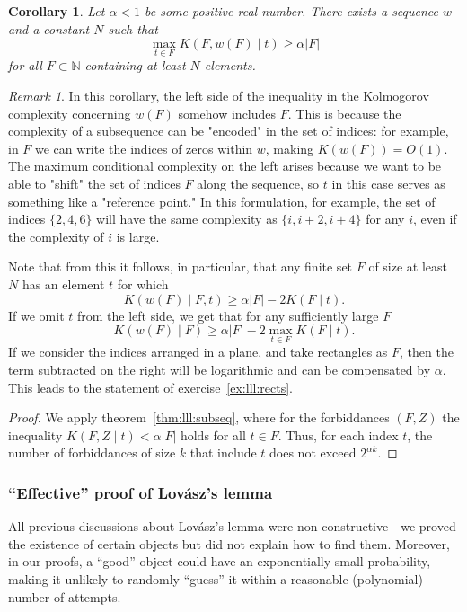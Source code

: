 \documentclass[12pt,sans]{article}
\theoremstyle{definition}
\theoremstyle{plain}
\newtheorem{corollary}{Corollary}[section]
\theoremstyle{remark}
\newtheorem{remark}{Remark}[section]
\begin{document}
\begin{corollary}
    Let $\alpha < 1$ be some positive real number.
    There exists a sequence $w$ and a constant $N$ such that
    \[
    \max_{t\in F} K(F,w(F) \mid t) \ge \alpha |F|
    \]
    for all $F\subset\mathbb{N}$ containing at least $N$ elements.
\end{corollary}

\begin{remark}
    In this corollary, the left side of the inequality in the Kolmogorov complexity concerning $w(F)$
    somehow includes $F$. This is because the complexity of a subsequence
    can be "encoded" in the set of indices: for example, in $F$ we can write
    the indices of zeros within $w$, making $K(w(F)) = O(1)$. The maximum conditional complexity
    on the left arises because we want to be able to "shift" the set of indices $F$
    along the sequence, so $t$ in this case serves as something like a "reference point."
    In this formulation, for example, the set of indices $\{2,4,6\}$ will
    have the same complexity as $\{i, i+2, i+4\}$ for any $i$, even if the complexity of $i$ is large.
\end{remark}

Note that from this it follows, in particular, that any finite set $F$
of size at least $N$ has an element $t$ for which
\[
K(w(F) \mid F, t) \ge \alpha |F| - 2K(F \mid t).
\]
If we omit $t$ from the left side, we get that for any sufficiently large $F$
\[
K(w(F) \mid F) \ge \alpha |F| - 2\max_{t\in F} K(F \mid t).
\]
If we consider the indices arranged in a plane, and take rectangles as $F$,
then the term subtracted on the right will be logarithmic and can be compensated by
$\alpha$. This leads to the statement of exercise~\ref{ex:lll:rects}.
\begin{proof}
    We apply theorem~\ref{thm:lll:subseq}, where for the forbiddances $(F,Z)$ the inequality
    $K(F,Z\mid t) < \alpha|F|$ holds for all $t\in F$. Thus, for
    each index $t$, the number of forbiddances of size $k$ that include $t$
    does not exceed $2^{\alpha k}$.
\end{proof}

\subsubsection{``Effective'' proof of Lovász's lemma}
All previous discussions about Lovász's lemma were non-constructive—we proved
the existence of certain objects but did not explain how to find them. Moreover,
in our proofs, a ``good'' object could have an exponentially small
probability, making it unlikely to randomly ``guess'' it within a
reasonable (polynomial) number of attempts.
\end{document}
